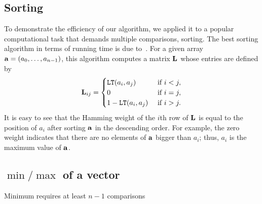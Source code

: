 \subsection{Sorting}
\label{subsec:sorting}

	To demonstrate the efficiency of our algorithm, we applied it to a popular computational task that demands multiple comparisons, sorting.
	The best sorting algorithm in terms of running time is due to~\cite{CDSS15}.
	For a given array $\mathbf{a} = (a_0,\dots,a_{n-1})$, this algorithm computes a matrix $\mathbf{L}$ whose entries are defined by
	\begin{align*}
		\mathbf{L}_{ij} =
		\begin{cases}
			\mathtt{LT}(a_i, a_j) & \text{ if } i < j, \\
			0 & \text{ if } i = j, \\
			1 - \mathtt{LT}(a_i, a_j) & \text{ if } i > j.
		\end{cases}
	\end{align*}
	It is easy to see that the Hamming weight of the $i$th row of $\mathbf{L}$ is equal to the position of $a_i$ after sorting $\mathbf{a}$ in the descending order.
	For example, the zero weight indicates that there are no elements of $\mathbf{a}$ bigger than $a_i$; thus, $a_i$ is the maximum value of $\mathbf{a}$.

\subsection{$\min/\max$ of a vector}
\label{sec:min/max}

	Minimum requires at least $n-1$ comparisons 

